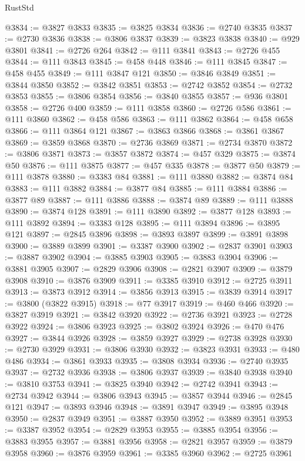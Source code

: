 \begin{lexlean}{RustStd}
\begin{coremodule}
@3834 := @3827 @3833
@3835 := @3825 @3834
@3836 := @2740 @3835
@3837 := @2730 @3836
@3838 := @3806 @3837
@3839 := @3823 @3838
@3840 := @929 @3801
@3841 := @2726 @264
@3842 := @111 @3841
@3843 := @2726 @455
@3844 := @111 @3843
@3845 := @458 @448
@3846 := @111 @3845
@3847 := @458 @455
@3849 := @111 @3847 @121
@3850 := @3846 @3849
@3851 := @3844 @3850
@3852 := @3842 @3851
@3853 := @2742 @3852
@3854 := @2732 @3853
@3855 := @3806 @3854
@3856 := @3840 @3855
@3857 := @936 @3801
@3858 := @2726 @400
@3859 := @111 @3858
@3860 := @2726 @586
@3861 := @111 @3860
@3862 := @458 @586
@3863 := @111 @3862
@3864 := @458 @658
@3866 := @111 @3864 @121
@3867 := @3863 @3866
@3868 := @3861 @3867
@3869 := @3859 @3868
@3870 := @2736 @3869
@3871 := @2734 @3870
@3872 := @3806 @3871
@3873 := @3857 @3872
@3874 := @457 @329
@3875 := @3874 @50
@3876 := @111 @3875
@3877 := @457 @335
@3878 := @3877 @50
@3879 := @111 @3878
@3880 := @3383 @84
@3881 := @111 @3880
@3882 := @3874 @84
@3883 := @111 @3882
@3884 := @3877 @84
@3885 := @111 @3884
@3886 := @3877 @89
@3887 := @111 @3886
@3888 := @3874 @89
@3889 := @111 @3888
@3890 := @3874 @128
@3891 := @111 @3890
@3892 := @3877 @128
@3893 := @111 @3892
@3894 := @3383 @128
@3895 := @111 @3894
@3896 := @3895 @121
@3897 := @2845 @3896
@3898 := @3893 @3897
@3899 := @3891 @3898
@3900 := @3889 @3899
@3901 := @3387 @3900
@3902 := @2837 @3901
@3903 := @3887 @3902
@3904 := @3885 @3903
@3905 := @3883 @3904
@3906 := @3881 @3905
@3907 := @2829 @3906
@3908 := @2821 @3907
@3909 := @3879 @3908
@3910 := @3876 @3909
@3911 := @3385 @3910
@3912 := @2725 @3911
@3913 := @3873 @3912
@3914 := @3856 @3913
@3915 := @3839 @3914
@3917 := @3800 (@3822 @3915)
@3918 := @77 @3917
@3919 := @460 @466
@3920 := @3827 @3919
@3921 := @3842 @3920
@3922 := @2736 @3921
@3923 := @2728 @3922
@3924 := @3806 @3923
@3925 := @3802 @3924
@3926 := @470 @476
@3927 := @3844 @3926
@3928 := @3859 @3927
@3929 := @2738 @3928
@3930 := @2730 @3929
@3931 := @3806 @3930
@3932 := @3823 @3931
@3933 := @480 @486
@3934 := @3861 @3933
@3935 := @3808 @3934
@3936 := @2740 @3935
@3937 := @2732 @3936
@3938 := @3806 @3937
@3939 := @3840 @3938
@3940 := @3810 @3753
@3941 := @3825 @3940
@3942 := @2742 @3941
@3943 := @2734 @3942
@3944 := @3806 @3943
@3945 := @3857 @3944
@3946 := @2845 @121
@3947 := @3893 @3946
@3948 := @3891 @3947
@3949 := @3895 @3948
@3950 := @2837 @3949
@3951 := @3887 @3950
@3952 := @3889 @3951
@3953 := @3387 @3952
@3954 := @2829 @3953
@3955 := @3885 @3954
@3956 := @3883 @3955
@3957 := @3881 @3956
@3958 := @2821 @3957
@3959 := @3879 @3958
@3960 := @3876 @3959
@3961 := @3385 @3960
@3962 := @2725 @3961

\end{coremodule}
\end{lexlean}
